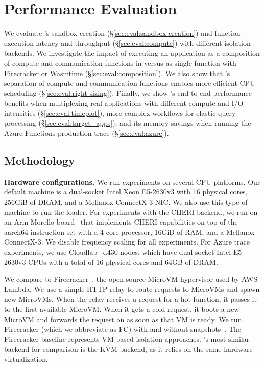 \section{Performance Evaluation}\label{sec:eval}

We evaluate \dandelion's sandbox creation (\S\ref{sec:eval:sandbox-creation}) and function execution latency and throughput (\S\ref{sec:eval:compute}) with different isolation backends. We investigate the impact of executing an application as a composition of compute and communication functions in \dandelion versus as single function with Firecracker or Wasmtime (\S\ref{sec:eval:composition}).
We also show that \dandelion's separation of compute and communication functions enables more efficient CPU scheduling (\S\ref{sec:eval:right-sizing}). Finally, we show \dandelion's end-to-end performance benefits when multiplexing real applications with different compute and I/O intensities (\S\ref{sec:eval:timeplot}), more complex workflows for elastic query processing (\S\ref{sec:eval:target_apps}), and its memory savings when running the Azure Functions production trace (\S\ref{sec:eval:azure}). 

\subsection{Methodology}


\textbf{Hardware configurations.} 
We run experiments on several CPU platforms.
Our default machine is a dual-socket Intel Xeon E5-2630v3 with 16 physical cores, 256GiB of DRAM, and a Mellanox ConnectX-3 NIC. We also use this type of machine to run the loader.
For experiments with the CHERI backend, we run \dandelion on an Arm Morello board~\cite{morello} that implements CHERI capabilities on top of the aarch64 instruction set with a 4-core processor, 16GiB of RAM, and a Mellanox ConnectX-3.
We disable frequency scaling for all experiments.
For Azure trace experiments, we use Cloudlab~\cite{cloudlab} d430 nodes, which have dual-socket Intel E5-2630v3 CPUs with a total of 16 physical cores and 64GB of DRAM.

We compare \dandelion to Firecracker~\cite{firecracker}, the open-source MicroVM hypervisor used by AWS Lambda. 
We use a simple HTTP relay to route requests to MicroVMs and spawn new MicroVMs.
When the relay receives a request for a hot function, it passes it to the first available MicroVM.
When it gets a cold request, it boots a new MicroVM and forwards the request on as soon as that VM is ready. We run Firecracker (which we abbreviate as FC) with and without snapshots~\cite{firecracker:snapshot_restoration}.
The Firecracker baseline represents VM-based isolation approaches. \dandelion's most similar backend for comparison is the KVM backend, as it relies on the same hardware virtualization.


